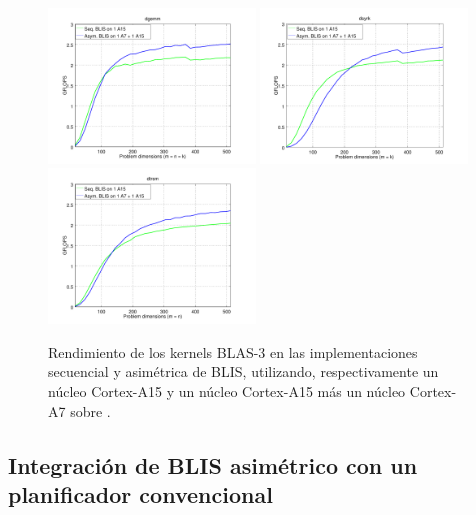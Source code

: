 \begin{figure}[t]
\centering
\includegraphics[width=0.49\textwidth]{Plots/BLIS_small/blis_dgemm_sym_asym}
\includegraphics[width=0.49\textwidth]{Plots/BLIS_small/blis_dsyrk_sym_asym}
\includegraphics[width=0.49\textwidth]{Plots/BLIS_small/blis_dtrsm_sym_asym}
	\caption[Rendimiento de los kernels BLAS-3 en las implementaciones secuencial y asimétrica de BLIS.]{Rendimiento de los kernels BLAS-3 en las implementaciones secuencial y asimétrica de BLIS, utilizando, respectivamente
         un núcleo Cortex-A15 y un núcleo Cortex-A15 más un núcleo Cortex-A7 sobre \odroid.}
\label{fig:cross_blis}
\end{figure}


\subsection{Integración de BLIS asimétrico con un planificador convencional}

